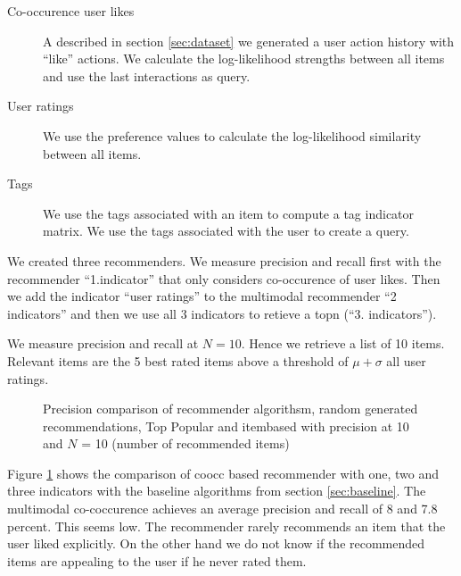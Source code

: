 \begin{description}
\item[Co-occurence user likes] A described in section \ref{sec:dataset} we generated a user action history with ``like'' actions. We calculate the log-likelihood strengths between all items and use the last interactions as query.
\item[User ratings] We use the preference values to calculate the log-likelihood similarity between all items.
\item[Tags] We use the tags associated with an item to compute a tag \gls{indicator} matrix. We use the tags associated with the user to create a query.
\end{description}

We created three recommenders. We measure precision and recall first with the recommender ``1.indicator'' that only considers co-occurence of user likes. Then we add the indicator ``user ratings'' to the multimodal recommender ``2 indicators'' and then we use all 3 indicators to retieve a \gls{topn} (``3. indicators''). 

We measure precision and recall at $N=10$. Hence we retrieve a list of 10 items. Relevant items are the 5 best rated items above a threshold of $\mu + \sigma$ all user ratings.

\pgfplotsset{width=7cm}
\begin{figure}
  \centering
{} 
\caption{Precision comparison of recommender algorithsm, random generated recommendations, Top Popular and itembased with precision at 10 and $N$ = 10 (number of recommended items)}
  \label{fig:precisionrecallvalues}
\end{figure}

Figure \ref{fig:precisionrecallvalues} shows the comparison of \gls{coocc} based recommender with one, two and three indicators with the baseline algorithms from section \ref{sec:baseline}.
The multimodal co-coccurence  achieves an average precision and recall of 8 and 7.8 percent. This seems low. The recommender rarely recommends an item that the user liked explicitly. On the other hand we do not know if the recommended items are appealing to the user if he never rated them.

